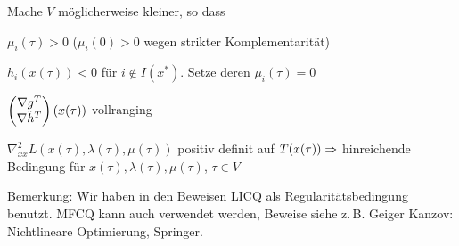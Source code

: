 Mache $V$ möglicherweise kleiner, so dass

\bitm
\item $\mu_i(\tau) > 0$ ($\mu_i(0) > 0$ wegen strikter Komplementarität)
\item $h_i(x(\tau)) < 0$ für $i \notin I(x^*)$. Setze deren $\mu_i(\tau)=0$
\item $\begin{pmatrix} \nabla g^T \\ \nabla \tilde h^T \end{pmatrix} (x(\tau))$ vollranging
\item $\nabla_{xx}^2 L(x(\tau), \lambda(\tau), \mu(\tau))$ positiv definit auf $T(x(\tau)) \Rightarrow$ hinreichende Bedingung für $x(\tau), \lambda(\tau), \mu(\tau)$, $\tau \in V$
\eitm


Bemerkung: Wir haben in den Beweisen LICQ als Regularitätsbedingung benutzt. MFCQ kann auch verwendet werden, Beweise siehe z.\,B. Geiger Kanzov: Nichtlineare Optimierung, Springer.











